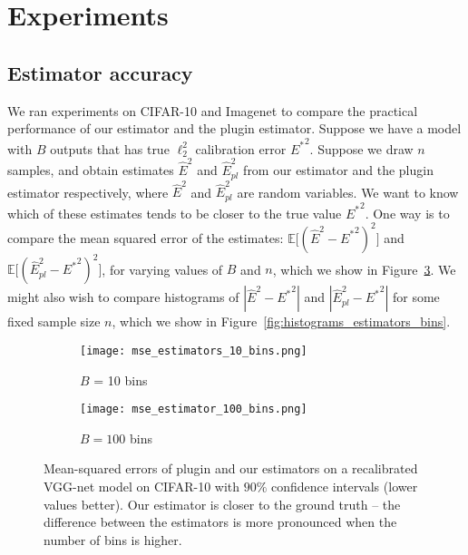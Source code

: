 \section{Experiments}

\subsection{Estimator accuracy}

We ran experiments on CIFAR-10 and Imagenet to compare the practical performance of our estimator and the plugin estimator. Suppose we have a model with $B$ outputs that has true $\ell_2^2$ calibration error ${E^*}^2$. Suppose we draw $n$ samples, and obtain estimates $\hat{E}^2$ and $\hat{E}_{pl}^2$ from our estimator and the plugin estimator respectively, where $\hat{E}^2$ and $\hat{E}_{pl}^2$ are random variables. We want to know which of these estimates tends to be closer to the true value ${E^*}^2$. One way is to compare the mean squared error of the estimates: $\mathbb{E}\big[ (\hat{E}^2 - {E^*}^2)^2 \big]$  and $\mathbb{E}\big[ (\hat{E}_{pl}^2 - {E^*}^2)^2 \big]$, for varying values of $B$ and $n$, which we show in Figure~\ref{fig:mse_estimators_bins}. We might also wish to compare histograms of $|\hat{E}^2 - {E^*}^2|$ and $|\hat{E}_{pl}^2 - {E^*}^2|$ for some fixed sample size $n$, which we show in Figure~\ref{fig:histograms_estimators_bins}.

\begin{figure}
  \centering
  \centering
     \begin{subfigure}[b]{0.45\textwidth}
         \centering
         \texttt{[image: mse\_estimators\_10\_bins.png]}
         \caption{$B$ = 10 bins}
         \label{fig:y equals x}
     \end{subfigure}
     \hfill
     \begin{subfigure}[b]{0.45\textwidth}
         \centering
         \texttt{[image: mse\_estimator\_100\_bins.png]}
         \caption{$B = 100$ bins}
         \label{fig:three sin x}
     \end{subfigure}
  \caption{Mean-squared errors of plugin and our estimators on a recalibrated VGG-net model on CIFAR-10 with $90\%$ confidence intervals (lower values better). Our estimator is closer to the ground truth -- the difference between the estimators is more pronounced when the number of bins is higher.}
  \label{fig:mse_estimators_bins}
\end{figure}

